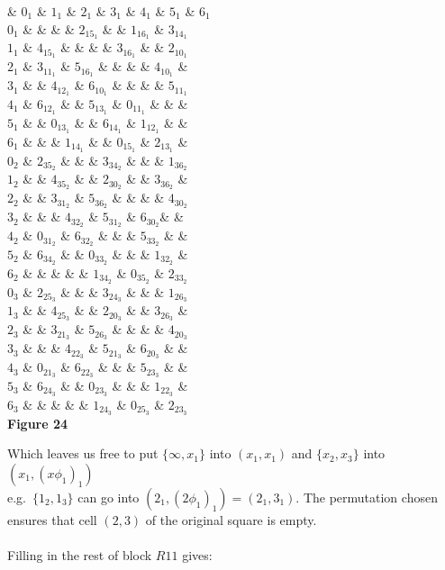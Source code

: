 \documentclass[
  12pt,
  a4paper]{book}
\begin{document}
\& \(0_1\) \& \(1_1\) \& \(2_1\) \& \(3_1\) \& \(4_1\) \& \(5_1\) \& \(6_1\)\\
\(0_1\) \& \& \& \& \(2_15_1\) \& \& \(1_16_1\) \& \(3_14_1\)\\
\(1_1\) \& \(4_15_1\) \& \& \& \& \(3_16_1\) \& \& \(2_10_1\)\\
\(2_1\) \& \(3_11_1\) \& \(5_16_1\) \& \& \& \& \(4_10_1\) \&\\
\(3_1\) \& \& \(4_12_1\) \& \(6_10_1\) \& \& \& \& \(5_11_1\)\\
\(4_1\) \& \(6_12_1\) \& \& \(5_13_1\) \& \(0_11_1\) \& \& \&\\
\(5_1\) \& \& \(0_13_1\) \& \& \(6_14_1\) \& \(1_12_1\) \& \&\\
\(6_1\) \& \& \& \(1_14_1\) \& \& \(0_15_1\) \& \(2_13_1\) \&\\
\(0_2\) \& \(2_35_2\) \& \& \& \(3_34_2\) \& \& \& \(1_36_2\)\\
\(1_2\) \& \& \(4_35_2\) \& \& \(2_30_2\) \& \& \(3_36_2\) \&\\
\(2_2\) \& \& \(3_31_2\) \& \(5_36_2\) \& \& \& \& \(4_30_2\)\\
\(3_2\) \& \& \& \(4_32_2\) \& \(5_31_2\) \& \(6_30_2\)\& \&\\
\(4_2\) \& \(0_31_2\) \& \(6_32_2\) \& \& \& \(5_33_2\) \& \&\\
\(5_2\) \& \(6_34_2\) \& \& \(0_33_2\) \& \& \& \(1_32_2\) \&\\
\(6_2\) \& \& \& \& \& \(1_34_2\) \& \(0_35_2\) \& \(2_33_2\)\\
\(0_3\) \& \(2_25_3\) \& \& \& \(3_24_3\) \& \& \& \(1_26_3\)\\
\(1_3\) \& \& \(4_25_3\) \& \& \(2_20_3\) \& \& \(3_26_3\) \&\\
\(2_3\) \& \& \(3_21_3\) \& \(5_26_3\) \& \& \& \& \(4_20_3\)\\
\(3_3\) \& \& \& \(4_22_3\) \& \(5_21_3\) \& \(6_20_3\) \& \&\\
\(4_3\) \& \(0_21_3\) \& \(6_22_3\) \& \& \& \(5_23_3\) \& \&\\
\(5_3\) \& \(6_24_3\) \& \& \(0_23_3\) \& \& \& \(1_22_3\) \&\\
\(6_3\) \& \& \& \& \& \(1_24_3\) \& \(0_25_3\) \& \(2_23_3\)\\

\textbf{Figure 24}

Which leaves us free to put \(\{\infty, x_1\}\) into \((x_1,x_1)\) and
\(\{x_2,x_3\}\) into \((x_1,(x\phi _1)_1)\)\\
e.g.~\(\{1_2,1_3\}\) can go into \((2_1,(2\phi _1)_1)=(2_1,3_1)\). The
permutation chosen ensures that cell \((2,3)\) of the original square is
empty.\\
~\\
Filling in the rest of block \(R11\) gives:
\end{document}
